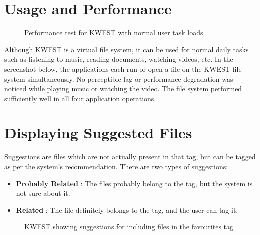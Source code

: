 \section{Usage and Performance}
\begin{figure}[htb]
\centering
\setlength\fboxsep{0pt}
\setlength\fboxrule{0.5pt}
\caption{Performance test for KWEST with normal user task loads}
\label{fig:dfd0}
\end{figure}
Although KWEST is a virtual file system, it can be used for normal daily tasks such as listening to music, reading documents, watching videos, etc. In the screenshot below, the applications each run or open a file on the KWEST file system simultaneously. No perceptible lag or performance degradation was noticed while playing music or watching the video. The file system performed sufficiently well in all four application operations.

\section{Displaying Suggested Files}
Suggestions are files which are not actually present in that tag, but can be tagged as per the system's recommendation. There are two types of suggestions:
\begin{itemize}
\item \textbf{Probably Related} : The files probably belong to the tag, but the system is not sure about it.
\item \textbf{Related} : The file definitely belongs to the tag, and the user can tag it.
\end{itemize}
\begin{figure}[htb]
\centering
\setlength\fboxsep{0pt}
\setlength\fboxrule{0.5pt}
\caption{KWEST showing suggestions for including files in the favourites tag}
\label{fig:dfd0}
\end{figure}

